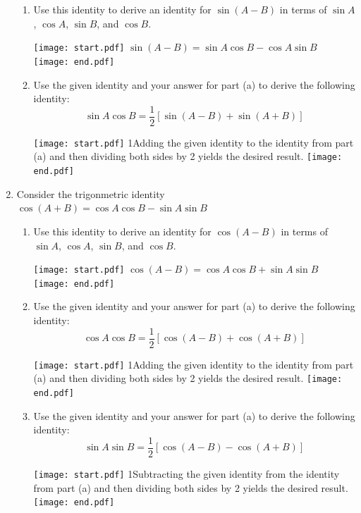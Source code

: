 \documentclass[12pt]{article}
\begin{document}
\begin{enumerate}
\begin{enumerate}
\item Use this identity to derive an identity for $\sin{(A-B)}$ in terms of $\sin{A}$, $\cos{A}$, $\sin{B}$, and $\cos{B}$.

\texttt{[image: start.pdf]}
{{$\sin{(A-B)}=\sin{A}\cos{B}-\cos{A}\sin{B}$}}
\texttt{[image: end.pdf]}


\item Use the given identity and your answer for part (a) to derive the following identity: $$\sin{A}\cos{B}=\frac{1}{2}\left[\sin{(A-B)}+\sin{(A+B)}\right]$$

\texttt{[image: start.pdf]}
{{{1\linewidth}{Adding the given identity to the identity from part (a) and then dividing both sides by 2 yields the desired result.}}}
\texttt{[image: end.pdf]}


\end{enumerate}

\item Consider the trigonmetric identity $\cos{(A+B)}=\cos{A}\cos{B}-\sin{A}\sin{B}$

\begin{enumerate}

\item Use this identity to derive an identity for $\cos{(A-B)}$ in terms of $\sin{A}$, $\cos{A}$, $\sin{B}$, and $\cos{B}$.

\texttt{[image: start.pdf]}
{{$\cos{(A-B)}=\cos{A}\cos{B}+\sin{A}\sin{B}$}}
\texttt{[image: end.pdf]}


\item Use the given identity and your answer for part (a) to derive the following identity: $$\cos{A}\cos{B}=\frac{1}{2}\left[\cos{(A-B)}+\cos{(A+B)}\right]$$

\texttt{[image: start.pdf]}
{{{1\linewidth}{Adding the given identity to the identity from part (a) and then dividing both sides by 2 yields the desired result.}}}
\texttt{[image: end.pdf]}


\item Use the given identity and your answer for part (a) to derive the following identity: $$\sin{A}\sin{B}=\frac{1}{2}\left[\cos{(A-B)}-\cos{(A+B)}\right]$$

\texttt{[image: start.pdf]}
{{{1\linewidth}{Subtracting the given identity from the identity from part (a) and then dividing both sides by 2 yields the desired result.}}}
\texttt{[image: end.pdf]}


\end{enumerate}

\end{enumerate}
\end{document}

